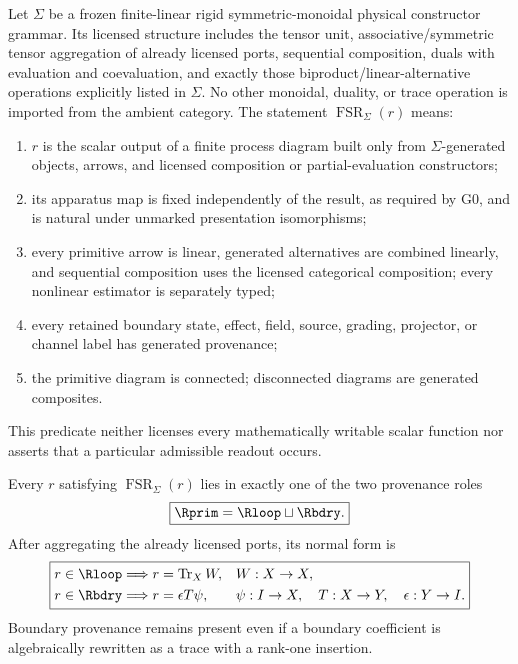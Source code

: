 \documentclass[12pt,a4paper]{article}
\begin{document}
\begin{definition}
\label{p2:def:finite-structural-readout}
Let \(\Sigma\) be a frozen finite-linear rigid symmetric-monoidal physical
constructor grammar.  Its licensed structure includes the tensor unit,
associative/symmetric tensor aggregation of already licensed ports, sequential
composition, duals with evaluation and coevaluation, and exactly those
biproduct/linear-alternative operations explicitly listed in \(\Sigma\).
No other monoidal, duality, or trace operation is imported from the ambient
category.  The statement \(\operatorname{FSR}_{\Sigma}(r)\) means:
\begin{enumerate}[label=(\roman*),leftmargin=2em]
\item \(r\) is the scalar output of a finite process diagram built only from
\(\Sigma\)-generated objects, arrows, and licensed composition or
partial-evaluation constructors;
\item its apparatus map is fixed independently of the result, as required by
G0, and is natural under unmarked presentation isomorphisms;
\item every primitive arrow is linear, generated alternatives are combined
linearly, and sequential composition uses the licensed categorical
composition; every nonlinear estimator is separately typed;
\item every retained boundary state, effect, field, source, grading,
projector, or channel label has generated provenance;
\item the primitive diagram is connected; disconnected diagrams are generated
composites.
\end{enumerate}
This predicate neither licenses every mathematically writable scalar function
nor asserts that a particular admissible readout occurs.
\end{definition}

\begin{theorem}
\label{p2:thm:loop-boundary-readout-exhaustion}
Every \(r\) satisfying \(\operatorname{FSR}_{\Sigma}(r)\) lies in exactly
one of the two provenance roles
\[
 \boxed{\Rprim=\Rloop\sqcup\Rbdry.}
\]
After aggregating the already licensed ports, its normal form is
\[
\boxed{
\begin{aligned}
 r\in\Rloop
 &\Longrightarrow r=\operatorname{Tr}_XW,
 &&W:X\to X,\\
 r\in\Rbdry
 &\Longrightarrow r=\epsilon T\psi,
 &&\psi:I\to X,
 \quad T:X\to Y,
 \quad\epsilon:Y\to I.
\end{aligned}}
\]
Boundary provenance remains present even if a boundary coefficient is
algebraically rewritten as a trace with a rank-one insertion.
\end{theorem}
\end{document}
